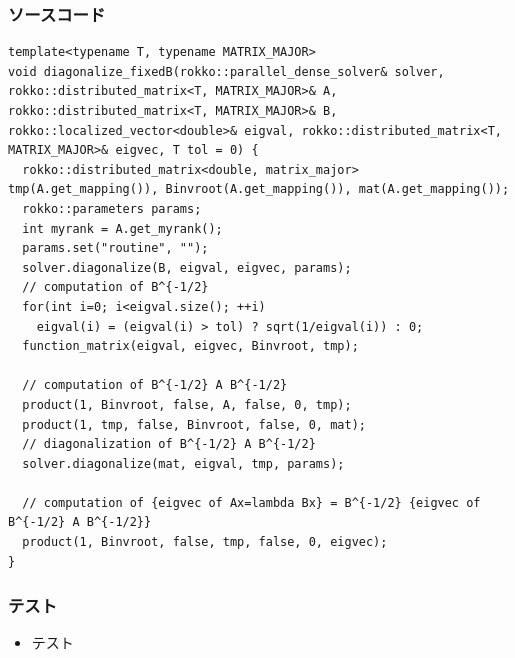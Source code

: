 \begin{frame}[c,fragile]
  \frametitle{ソースコード}
\begin{lstlisting}
template<typename T, typename MATRIX_MAJOR>
void diagonalize_fixedB(rokko::parallel_dense_solver& solver, rokko::distributed_matrix<T, MATRIX_MAJOR>& A, rokko::distributed_matrix<T, MATRIX_MAJOR>& B, rokko::localized_vector<double>& eigval, rokko::distributed_matrix<T, MATRIX_MAJOR>& eigvec, T tol = 0) {
  rokko::distributed_matrix<double, matrix_major> tmp(A.get_mapping()), Binvroot(A.get_mapping()), mat(A.get_mapping());
  rokko::parameters params;
  int myrank = A.get_myrank();
  params.set("routine", "");
  solver.diagonalize(B, eigval, eigvec, params);
  // computation of B^{-1/2}
  for(int i=0; i<eigval.size(); ++i)
    eigval(i) = (eigval(i) > tol) ? sqrt(1/eigval(i)) : 0;
  function_matrix(eigval, eigvec, Binvroot, tmp);
  
  // computation of B^{-1/2} A B^{-1/2}
  product(1, Binvroot, false, A, false, 0, tmp);
  product(1, tmp, false, Binvroot, false, 0, mat);
  // diagonalization of B^{-1/2} A B^{-1/2}
  solver.diagonalize(mat, eigval, tmp, params);

  // computation of {eigvec of Ax=lambda Bx} = B^{-1/2} {eigvec of B^{-1/2} A B^{-1/2}}
  product(1, Binvroot, false, tmp, false, 0, eigvec);
}
\end{lstlisting}
\end{frame}




\begin{frame}
  \frametitle{テスト}
  \begin{itemize}
  \item テスト
  \end{itemize}
\end{frame}


